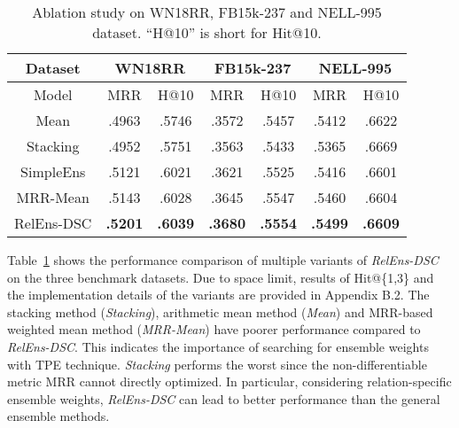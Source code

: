 \documentclass[11pt,a4paper]{article}
\begin{document}
    \begin{table}[ht]
  	\centering
\caption{Ablation study on WN18RR, FB15k-237 and NELL-995 dataset.
  		``H@10'' is short for Hit@10.}
\small
  	\renewcommand{\arraystretch}{1.1}
  	\vspace{-8px}
  	\setlength\tabcolsep{2.6pt}
  	\begin{tabular}{c|cc|cc|cc}
  		\toprule
  		Dataset    & \multicolumn{2}{c|}{WN18RR} & \multicolumn{2}{c|}{FB15k-237} & \multicolumn{2}{c}{NELL-995}                                                       \\ \midrule
  		Model      & MRR                         & H@10                          & MRR                          & H@10            & MRR             & H@10            \\ \midrule
  		Mean       & .4963                      & .5746                        & .3572                       & .5457          & .5412          & .6622          \\
  		Stacking   & .4952                      & .5751                        & .3563                       & .5433          & .5365          & .6669          \\
  		SimpleEns  & .5121                      & .6021                        & .3621                       & .5525          & .5416          & .6601          \\
  		MRR-Mean  & .5143                      & .6028                        & .3645                       & .5547          & .5460          & .6604          \\
  		RelEns-DSC & \textbf{.5201}   & \textbf{.6039}   & \textbf{.3680}    & \textbf{.5554} & \textbf{.5499} & \textbf{.6609} \\ \bottomrule
  	\end{tabular}
  	\label{tab:ensemble}
\end{table}

  Table~\ref{tab:ensemble} shows the performance comparison of multiple variants of \textit{RelEns-DSC} on the three benchmark datasets.
  Due to space limit, results of Hit@\{1,3\}
  and the implementation details of the variants are provided in Appendix B.2.
  The stacking method (\textit{Stacking}), arithmetic mean method (\textit{Mean}) 
  and MRR-based weighted mean method (\textit{MRR-Mean})
  have poorer performance compared to \textit{RelEns-DSC}.
  This indicates the importance of searching for ensemble weights
  with TPE technique.
  \textit{Stacking} performs the worst since 
  the non-differentiable metric MRR cannot directly optimized.
  In particular,
  considering relation-specific ensemble weights,
  \textit{RelEns-DSC} 
  can lead to better performance than the general ensemble methods.
 
\end{document}
